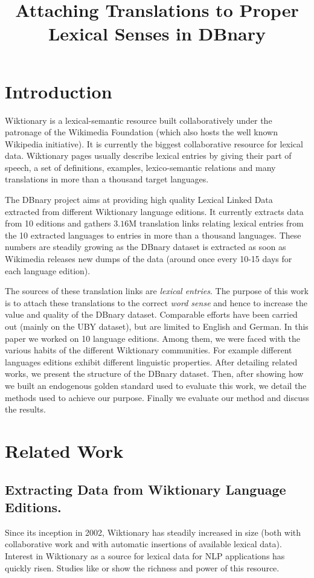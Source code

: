\documentclass[10pt, a4paper]{article}
\title{Attaching Translations to Proper Lexical Senses in DBnary}
\begin{document}
\maketitleabstract

\section{Introduction}

Wiktionary is a lexical-semantic resource built collaboratively under the patronage of the Wikimedia Foundation (which also hosts the well known Wikipedia initiative). It is currently the biggest collaborative resource for lexical data. Wiktionary pages usually describe lexical entries by giving their part of speech, a set of definitions, examples, lexico-semantic relations and many translations in more than a thousand target languages.

The DBnary project \cite{serasset:dbnary-swj} aims at providing high quality Lexical Linked Data extracted from different Wiktionary language editions. It currently extracts data from 10 editions and gathers $3.16$M translation links relating lexical entries from the 10 extracted languages to entries in more than a thousand languages. These numbers are steadily growing as the DBnary dataset is extracted as soon as Wikimedia releases new dumps of the data (around once every 10-15 days for each language edition).

The sources of these translation links are \emph{lexical entries}. The purpose of this work is to attach these translations to the correct \emph{word sense} and hence to increase the value and quality of the DBnary dataset. Comparable efforts have been carried out (mainly on the UBY dataset), but are limited to English and German. In this paper we worked on 10 language editions. Among them, we were faced with the various habits of the different Wiktionary communities. For example different languages editions exhibit different linguistic properties. 
After detailing related works, we present the structure of the DBnary dataset. Then, after showing how we built an endogenous golden standard used to evaluate this work, we detail the methods used to achieve our purpose. Finally we evaluate our method and discuss the results.

\section{Related Work}

\subsection{Extracting Data from Wiktionary Language Editions.} Since its inception in 2002, Wiktionary has steadily increased in size (both with collaborative work and with automatic insertions of available lexical data). Interest in Wiktionary as a source for lexical data for NLP applications has quickly risen. Studies like \cite{Zesch:AAAI2008} or \cite{navarro-EtAl:2009:PeoplesWeb} show the richness and power of this resource. 
\end{document}
